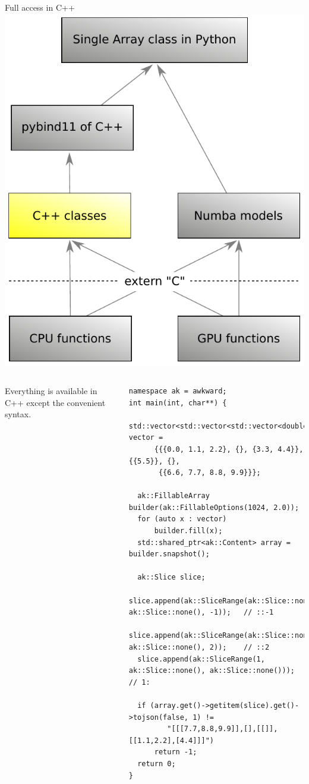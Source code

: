\documentclass[aspectratio=169]{beamer}
\begin{document}
\begin{frame}[fragile]{Full access in C++}
\large
\vspace{0.35 cm}
\hfill\mbox{\includegraphics[height=4 cm]{awkward-1-0-layers-mini-cpp.pdf}\hspace{-0.75 cm}}

\vspace{-4 cm}
\begin{columns}
Everything is available in C++ except the convenient syntax.

\scriptsize
\begin{verbatim}
namespace ak = awkward;
int main(int, char**) {
  std::vector<std::vector<std::vector<double>>> vector =
      {{{0.0, 1.1, 2.2}, {}, {3.3, 4.4}}, {{5.5}}, {},
       {{6.6, 7.7, 8.8, 9.9}}};

  ak::FillableArray builder(ak::FillableOptions(1024, 2.0));
  for (auto x : vector)
      builder.fill(x);
  std::shared_ptr<ak::Content> array = builder.snapshot();

  ak::Slice slice;
  slice.append(ak::SliceRange(ak::Slice::none(), ak::Slice::none(), -1));   // ::-1
  slice.append(ak::SliceRange(ak::Slice::none(), ak::Slice::none(), 2));    // ::2
  slice.append(ak::SliceRange(1, ak::Slice::none(), ak::Slice::none()));    // 1:

  if (array.get()->getitem(slice).get()->tojson(false, 1) !=
         "[[[7.7,8.8,9.9]],[],[[]],[[1.1,2.2],[4.4]]]")
      return -1;
  return 0;
}
\end{verbatim}

\vspace{5 cm}
\end{columns}
\end{frame}
\end{document}
